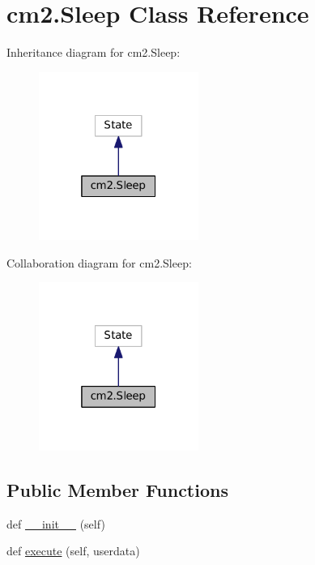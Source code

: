 \hypertarget{classcm2_1_1Sleep}{}\section{cm2.\+Sleep Class Reference}
\label{classcm2_1_1Sleep}


Inheritance diagram for cm2.\+Sleep\+:\nopagebreak
\begin{figure}[H]
\begin{center}
\leavevmode
\includegraphics[width=148pt]{classcm2_1_1Sleep__inherit__graph}
\end{center}
\end{figure}


Collaboration diagram for cm2.\+Sleep\+:\nopagebreak
\begin{figure}[H]
\begin{center}
\leavevmode
\includegraphics[width=148pt]{classcm2_1_1Sleep__coll__graph}
\end{center}
\end{figure}
\subsection*{Public Member Functions}
\begin{DoxyCompactItemize}
\item 
def \hyperlink{classcm2_1_1Sleep_a1a2bb497e61fdd8df5cbdbd356ae7875}{\+\_\+\+\_\+init\+\_\+\+\_\+} (self)
\item 
def \hyperlink{classcm2_1_1Sleep_aa6395f8f645733f653ff6342547698c0}{execute} (self, userdata)
\end{DoxyCompactItemize}
